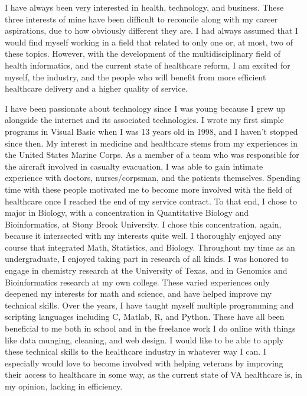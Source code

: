 \documentclass[12pt, a4paper]{awesome-cv}
\begin{document}

\makelettertitle

\begin{cvletter}

I have always been very interested in health, technology, and business. These three interests of mine have been difficult to reconcile along with my career aspirations, due to how obviously different they are. I had always assumed that I would find myself working in a field that related to only one or, at most, two of these topics. However, with the development of the multidisciplinary field of health informatics, and the current state of healthcare reform, I am excited for myself, the industry, and the people who will benefit from more efficient healthcare delivery and a higher quality of service. 

I have been passionate about technology since I was young because I grew up alongside the internet and its associated technologies. I wrote my first simple programs in Visual Basic when I was 13 years old in 1998, and I haven’t stopped since then. My interest in medicine and healthcare stems from my experiences in the United States Marine Corps. As a member of a team who was responsible for the aircraft involved in casualty evacuation, I was able to gain intimate experience with doctors, nurses/corpsman, and the patients themselves. Spending time with these people motivated me to become more involved with the field of healthcare once I reached the end of my service contract. To that end, I chose to major in Biology, with a concentration in Quantitative Biology and Bioinformatics, at Stony Brook University. I chose this concentration, again, because it intersected with my interests quite well. I thoroughly enjoyed any course that integrated Math, Statistics, and Biology. Throughout my time as an undergraduate, I enjoyed taking part in research of all kinds. I was honored to engage in chemistry research at the University of Texas, and in Genomics and Bioinformatics research at my own college. These varied experiences only deepened my interests for math and science, and have helped improve my technical skills. Over the years, I have taught myself multiple programming and scripting languages including C, Matlab, R, and Python. These have all been beneficial to me both in school and in the freelance work I do online with things like data munging, cleaning, and web design. I would like to be able to apply these technical skills to the healthcare industry in whatever way I can. I especially would love to become involved with helping veterans by improving their access to healthcare in some way, as the current state of VA healthcare is, in my opinion, lacking in efficiency.


\end{cvletter}
\end{document}
